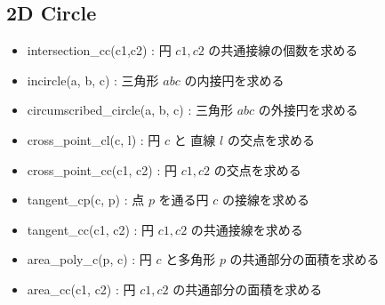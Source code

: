 \subsection{2D Circle}

\begin{itemize}
    \item intersection\_cc(c1,c2) : 円 $c1, c2$ の共通接線の個数を求める
    \item incircle(a, b, c) : 三角形 $abc$ の内接円を求める
    \item circumscribed\_circle(a, b, c) : 三角形 $abc$ の外接円を求める
    \item cross\_point\_cl(c, l) : 円 $c$ と 直線 $l$ の交点を求める
    \item cross\_point\_cc(c1, c2) : 円 $c1, c2$ の交点を求める
    \item tangent\_cp(c, p) : 点 $p$ を通る円 $c$ の接線を求める
    \item tangent\_cc(c1, c2) : 円 $c1, c2$ の共通接線を求める
    \item area\_poly\_c(p, c) : 円 $c$ と多角形 $p$ の共通部分の面積を求める
    \item area\_cc(c1, c2) : 円 $c1, c2$ の共通部分の面積を求める
\end{itemize}

